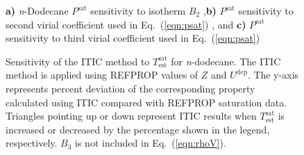 \documentclass[5p,times]{elsarticle}
\begin{document}
\begin{figure}
\caption{
\textbf{a)} \textit{n}-Dodecane $P^{\mathrm{sat}}$ sensitivity to isotherm $B_2$
,\textbf{b)} $P^{\mathrm{sat}}$ sensitivity to second virial coefficient used in Eq.~(\ref{eqn:psat})
, and \textbf{c)} $P^{\mathrm{sat}}$ sensitivity to third virial coefficient used in Eq.~(\ref{eqn:psat})
}
\label{fig:B2-sensitivity}
\end{figure}

\begin{figure}
\centering
{}
\caption{
Sensitivity of the ITIC method to $T^\mathrm{sat}_\mathrm{est}$ for \textit{n}-dodecane. The ITIC method is applied using REFPROP values of $Z$ and $U^\mathrm{dep}$. The y-axis represents percent deviation of the corresponding property calculated using ITIC compared with REFPROP saturation data. Triangles pointing up or down represent ITIC results when $T^\mathrm{sat}_\mathrm{est}$ is increased or decreased by the percentage shown in the legend, respectively. $B_3$ is not included in Eq.~(\ref{eqn:rhoV}).
}
\label{fig:Nist-val-tsat-sensitivity}
\end{figure}
\end{document}
